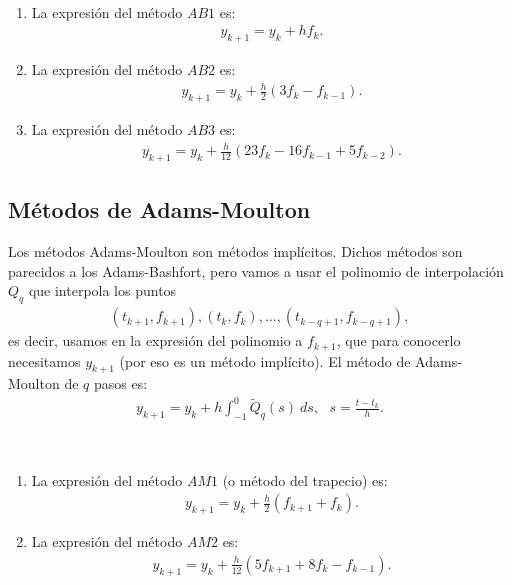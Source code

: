 \begin{ejemplo} \
    \begin{enumerate}
        \item La expresión del método $AB1$ es:
              \begin{align*}
                  y_{k+1} = y_k + hf_k.
              \end{align*}
        \item La expresión del método $AB2$ es:
              \begin{align*}
                  y_{k+1} = y_k + \frac{h}{2}(3f_k - f_{k-1}).
              \end{align*}
        \item La expresión del método $AB3$ es:
              \begin{align*}
                  y_{k+1} = y_k + \frac{h}{12}(23f_k - 16f_{k-1} +5f_{k-2}).
              \end{align*}
    \end{enumerate}
\end{ejemplo}

\subsection{Métodos de Adams-Moulton}

Los métodos Adams-Moulton son métodos implícitos. Dichos métodos son parecidos a los Adams-Bashfort, pero vamos a usar el polinomio de interpolación $Q_q$ que interpola los puntos
\begin{align*}
    (t_{k+1},f_{k+1}),(t_k,f_k),\ldots,(t_{k-q+1},f_{k-q+1}),
\end{align*}
es decir, usamos en la expresión del polinomio a $f_{k+1}$, que para conocerlo necesitamos $y_{k+1}$ (por eso es un método implícito). El método de Adams-Moulton de $q$ pasos es:
\begin{align*}
    \boxed{
        y_{k+1} = y_k + h\int_{-1}^{0} \widetilde{Q}_q (s) \ ds, \ \ \ s = \frac{t - t_k}{h}.
    }
\end{align*}

\begin{ejemplo} \
    \begin{enumerate}
        \item La expresión del método $AM1$ (o método del trapecio) es:
              \begin{align*}
                  y_{k+1} = y_k + \frac{h}{2}(f_{k+1} + f_k).
              \end{align*}
        \item La expresión del método $AM2$ es:
              \begin{align*}
                  y_{k+1} = y_k +\frac{h}{12}(5f_{k+1} + 8f_{k} - f_{k-1}).
              \end{align*}
    \end{enumerate}
\end{ejemplo}

